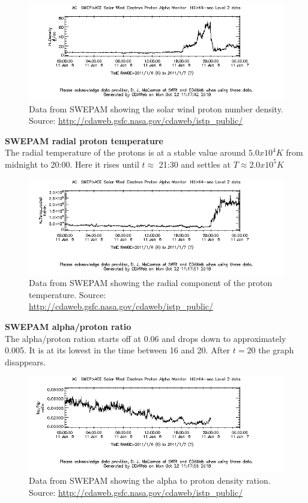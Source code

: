 \documentclass[norsk,a4paper,12pt]{article}
\begin{document}
\begin{multicols}{2}
\begin{figure}[H]
	\includegraphics[scale=0.4]{Figures/ACE_H_Density.png}
	\centering
	\caption{Data from SWEPAM showing the solar wind proton number density. Source: \url{http://cdaweb.gsfc.nasa.gov/cdaweb/istp_public/}}
	\label{fig:ACE_H_Density}
\end{figure}


\textbf{SWEPAM radial proton temperature}\\
The radial temperature of the protons is at a stable value around $5.0x10^4 K$ from midnight to 20:00. Here it rises until $t \approx$ 21:30 and settles at $T \approx 2.0x10^5 K$

\begin{figure}[H]
	\includegraphics[scale=0.4]{Figures/ACE_H_Temp_radial.png}
	\centering
	\caption{Data from SWEPAM showing the radial component of the proton temperature. Source: \url{http://cdaweb.gsfc.nasa.gov/cdaweb/istp_public/}}
	\label{fig:ACE_temp}
\end{figure}



\textbf{SWEPAM alpha/proton ratio}\\
The alpha/proton ration starts off at 0.06 and drops down to approximately 0.005. It is at its lowest in the time between 16 and 20. After $t=20$ the graph disappears.

\begin{figure}[H]
	\includegraphics[scale=0.4]{Figures/ACE_Na_Np.png}
	\centering
	\caption{Data from SWEPAM showing the alpha to proton density ration. Source: \url{http://cdaweb.gsfc.nasa.gov/cdaweb/istp_public/}}
	\label{fig:ACE_na_np}
\end{figure}



\end{multicols}
\end{document}
